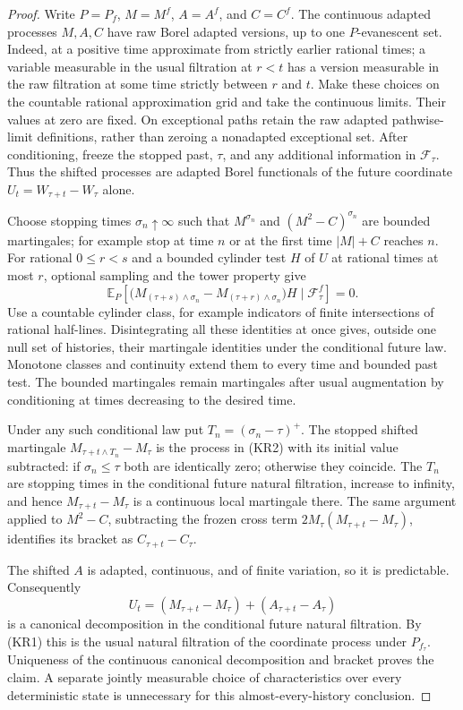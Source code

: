 \documentclass[11pt]{article}
\theoremstyle{definition}\newtheorem{definition}[theorem]{Definition}
\theoremstyle{remark}\newtheorem{remark}[theorem]{Remark}
\begin{document}
\begin{proof}
Write $P=P_f$, $M=M^f$, $A=A^f$, and $C=C^f$.
The continuous adapted processes $M,A,C$ have raw Borel adapted versions,
up to one $P$-evanescent set. Indeed, at a positive time approximate from
strictly earlier rational times; a variable measurable in the usual
filtration at $r<t$ has a version measurable in the raw filtration at
some time strictly between $r$ and $t$. Make these choices on the
countable rational approximation grid and take the continuous limits.
Their values at zero are fixed. On exceptional paths retain the raw
adapted pathwise-limit definitions, rather than zeroing a nonadapted
exceptional set. After conditioning, freeze the stopped past, $\tau$,
and any additional information in $\mathcal F_\tau$. Thus the
shifted processes are adapted Borel functionals of the future coordinate
$U_t=W_{\tau+t}-W_\tau$ alone.

Choose stopping times $\sigma_n\uparrow\infty$ such that
$M^{\sigma_n}$ and $(M^2-C)^{\sigma_n}$ are bounded martingales; for
example stop at time $n$ or at the first time $|M|+C$ reaches $n$.
For rational $0\le r<s$ and a bounded cylinder test $H$ of $U$ at
rational times at most $r$, optional sampling and the tower property give
\[
 \mathbb E_P\!\left[
   \bigl(M_{(\tau+s)\wedge\sigma_n}
        -M_{(\tau+r)\wedge\sigma_n}\bigr)H
       \mid\mathcal F^f_\tau\right]=0.
 \tag{KR2}
\]
Use a countable cylinder class, for example indicators of finite
intersections of rational half-lines. Disintegrating all these identities
at once gives, outside one null set of histories, their martingale
identities under the conditional future law. Monotone classes and
continuity extend them to every time and bounded past test. The bounded
martingales remain martingales after usual augmentation by conditioning
at times decreasing to the desired time.

Under any such conditional law put
$T_n=(\sigma_n-\tau)^+$. The stopped shifted martingale
$M_{\tau+t\wedge T_n}-M_\tau$ is the process in (KR2) with its initial
value subtracted: if $\sigma_n\le\tau$ both are identically zero; otherwise
they coincide. The $T_n$ are stopping times in the conditional future
natural filtration, increase to infinity, and hence
$M_{\tau+t}-M_\tau$ is a continuous local martingale there. The same
argument applied to $M^2-C$, subtracting the frozen cross term
$2M_\tau(M_{\tau+t}-M_\tau)$, identifies its bracket as
$C_{\tau+t}-C_\tau$.

The shifted $A$ is adapted, continuous, and of finite variation, so it is
predictable. Consequently
\[
 U_t=(M_{\tau+t}-M_\tau)+(A_{\tau+t}-A_\tau)
\]
is a canonical decomposition in the conditional future natural
filtration. By (KR1) this is the usual natural filtration of the
coordinate process under $P_{f_\tau}$. Uniqueness of the continuous
canonical decomposition and bracket proves the claim. A separate
jointly measurable choice of characteristics over every deterministic
state is unnecessary for this almost-every-history conclusion.
\end{proof}
\end{document}
